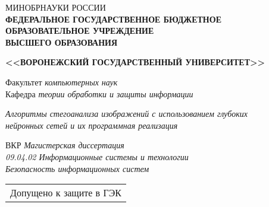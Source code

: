 \begin{titlepage}

\centering
\begin{arial}
\begingroup

\fontsize{12pt}{12pt}\selectfont
МИНОБРНАУКИ РОССИИ\\
\endgroup
\begingroup
\fontsize{10pt}{10pt}\selectfont
\textbf{ФЕДЕРАЛЬНОЕ ГОСУДАРСТВЕННОЕ БЮДЖЕТНОЕ ОБРАЗОВАТЕЛЬНОЕ УЧРЕЖДЕНИЕ}\\
\textbf{ВЫСШЕГО ОБРАЗОВАНИЯ}\\
\endgroup

\begingroup
\fontsize{12pt}{12pt}\selectfont
\textbf{<<ВОРОНЕЖСКИЙ ГОСУДАРСТВЕННЫЙ УНИВЕРСИТЕТ>>}\\

\vspace{7mm}

Факультет \textit{компьютерных наук}\\
Кафедра \textit{теории обработки и защиты информации}\\

\vspace{38mm}

\textit{Алгоритмы стегоанализа изображений с использованием глубоких} \\
\textit{нейронных сетей и их программная реализация} \\
\endgroup

\vspace{25mm}

\begingroup
\fontsize{12pt}{12pt}\selectfont
ВКР \textit{Магистерская диссертация}\\
\textit{09.04.02 Информационные системы и технологии}\\
\textit{Безопасность информационных систем}\\

\vspace{30mm}

\begin{tabularx}{\textwidth}{l}
Допущено к защите в ГЭК\\
\end{tabularx}
\vspace{5mm}


\end{arial}
\end{titlepage}
